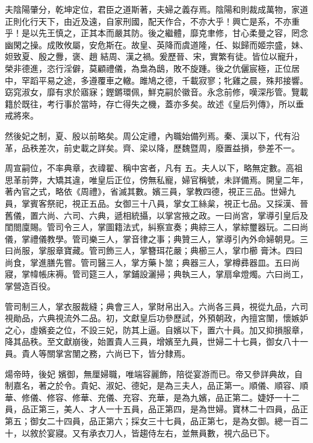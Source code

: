 
\begin{pinyinscope}

 夫陰陽肇分，乾坤定位，君臣之道斯著，夫婦之義存焉。陰陽和則裁成萬物，家道正則化行天下，由近及遠，自家刑國，配天作合，不亦大乎！興亡是系，不亦重乎！是以先王慎之，正其本而嚴其防。後之繼體，靡克聿修，甘心柔曼之容，罔念幽閑之操。成敗攸屬，安危斯在。故皇、英降而虞道隆，任、姒歸而姬宗盛，妹、妲致夏、殷之釁，褒、趙
 結周、漢之禍。爰歷晉、宋，實繁有徒。皆位以寵升，榮非德進，恣行淫僻，莫顧禮儀，為梟為鴟，敗不旋踵。後之伉儷宸極，正位居中，罕蹈平易之途，多遵覆車之轍。雎鳩之德，千載寂寥；牝雞之晨，殊邦接響。窈窕淑女，靡有求於寤寐；鏗鏘環佩，鮮克嗣於徽音。永念前修，嘆深彤管。覽載籍於既往，考行事於當時，存亡得失之機，蓋亦多矣。故述《皇后列傳》，所以垂戒將來。



 然後妃之制，夏、殷以前略矣。周公定禮，內職始備列焉。秦、漢以下，代有沿革，品秩差次，前史載之詳矣。齊、梁以降，歷魏暨周，廢置益損，參差不一。



 周宣嗣位，不率典章，衣禕翟、稱中宮者，凡有
 五。夫人以下，略無定數。高祖思革前弊，大矯其違，唯皇后正位，傍無私寵，婦官稱號，未詳備焉。開皇二年，著內官之式，略依《周禮》，省滅其數。嬪三員，掌教四德，視正三品。世婦九員，掌賓客祭祀，視正五品。女御三十八員，掌女工絲枲，視正七品。又採漢、晉舊儀，置六尚、六司、六典，遞相統攝，以掌宮掖之政。一曰尚宮，掌導引皇后及閨閤廩賜。管司令三人，掌圖籍法式，糾察宣奏；典綜三人，掌綜璽器玩。二曰尚儀，掌禮儀教學。管司樂三人，掌音律之事；典贊三人，掌導引內外命婦朝見。三曰尚服，掌服章寶藏。管司飾三人，掌簪珥花嚴；典櫛三人，掌巾櫛
 膏沐。四曰尚食，掌進膳先嘗。管司醫三人，掌方藥卜筮；典器三人，掌樽彞器皿。五曰尚寢，掌幃帳床褥。管司筵三人，掌鋪設灑掃；典執三人，掌扇傘燈燭。六曰尚工，掌營造百役。



 管司制三人，掌衣服裁縫；典會三人，掌財帛出入。六尚各三員，視從九品，六司視勛品，六典視流外二品。初，文獻皇后功參歷試，外預朝政，內擅宮闈，懷嫉妒之心，虛嬪妾之位，不設三妃，防其上逼。自嬪以下，置六十員。加又抑損服章，降其品秩。至文獻崩後，始置貴人三員，增嬪至九員，世婦二十七員，御女八十一員。貴人等關掌宮闈之務，六尚已下，皆分隸焉。



 煬帝時，後妃
 嬪御，無厘婦職，唯端容麗飾，陪從宴游而已。帝又參詳典故，自制嘉名，著之於令。貴妃、淑妃、德妃，是為三夫人，品正第一。順儀、順容、順華、修儀、修容、修華、充儀、充容、充華，是為九嬪，品正第二。婕妤一十二員，品正第三，美人、才人一十五員，品正第四，是為世婦。寶林二十四員，品正第五；御女二十四員，品正第六；採女三十七員，品正第七，是為女御。總一百二十，以敘於宴寢。又有承衣刀人，皆趨侍左右，並無員數，視六品已下。




\end{pinyinscope}
